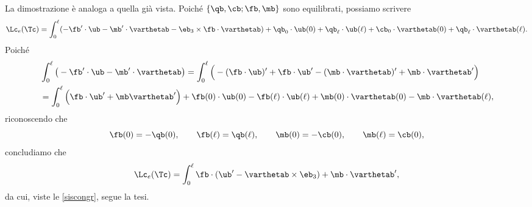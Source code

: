 La dimostrazione è analoga a quella già vista. Poiché $\{\qb, \cb; \fb, \mb\}$ sono equilibrati, possiamo scrivere 
	\begin{equation}
	\begin{aligned}
		\Lc_e(\Tc)=\int_0^\ell(-\fb'\cdot \ub-\mb'\cdot \varthetab-\eb_{3}\times \fb\cdot \varthetab)+\qb_0\cdot \ub(0)+\qb_\ell\cdot \ub(\ell)+\cb_0\cdot \varthetab(0)+\qb_\ell\cdot \varthetab(\ell).
	\end{aligned}
\end{equation}
Poiché
\begin{equation}
\begin{aligned}
&	\int_{0}^\ell\big(-\fb'\cdot\ub-\mb'\cdot \varthetab\big)=\int_{0}^\ell  \Big(-(\fb\cdot \ub)'+\fb\cdot\ub'-(\mb\cdot \varthetab)'+\mb \cdot\varthetab'\Big)\\
&=\int_{0}^\ell \Big(\fb\cdot\ub'+\mb \varthetab' \Big)+\fb(0)\cdot\ub(0)-\fb(\ell)\cdot\ub(\ell)+\mb (0)\cdot \varthetab(0)-\mb \cdot\varthetab(\ell),
\end{aligned}
\end{equation}
riconoscendo che
\begin{equation}
	\fb(0)=-\qb (0), \qquad \fb(\ell)=\qb (\ell), \qquad \mb (0)=-\cb(0), \qquad \mb (\ell)=\cb (0),
\end{equation}
concludiamo che
	\begin{equation}
	\begin{aligned}
		\Lc_e(\Tc)=\int_0^\ell\fb\cdot( \ub'-\varthetab\times\eb_3)+\mb\cdot \varthetab' ,
			\end{aligned}
\end{equation}
da cui, viste le \eqref{siscongr}, segue la tesi.

